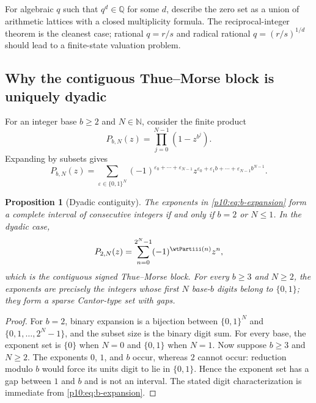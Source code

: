 \documentclass[11pt]{article}
\numberwithin{equation}{section}
\newtheorem{proposition}[theorem]{Proposition}
\theoremstyle{definition}
\theoremstyle{remark}
\newcommand{\Q}{\mathbb Q}
\newcommand{\N}{\mathbb N}
\begin{document}
\begin{problem}
For algebraic $q$ such that $q^d\in\Q$ for some $d$, describe the zero set as a union of
arithmetic lattices with a closed multiplicity formula.  The reciprocal-integer theorem is
the cleanest case; rational $q=r/s$ and radical rational $q=(r/s)^{1/d}$ should lead to a
finite-state valuation problem.
\end{problem}

\subsection{Why the contiguous Thue--Morse block is uniquely dyadic}

For an integer base $b\ge2$ and $N\in\N$, consider the finite product
\begin{equation}
 P_{b,N}(z)=\prod_{j=0}^{N-1}(1-z^{b^j}).                    \label{p10:eq:b-product}
\end{equation}
Expanding by subsets gives
\begin{equation}
 P_{b,N}(z)
 =\sum_{\varepsilon\in\{0,1\}^N}
  (-1)^{\varepsilon_0+\cdots+\varepsilon_{N-1}}
  z^{\varepsilon_0+\varepsilon_1b+\cdots+\varepsilon_{N-1}b^{N-1}}. \label{p10:eq:b-expansion}
\end{equation}

\begin{proposition}[Dyadic contiguity]
\label{p10:prop:dyadic-contiguity}
The exponents in \eqref{p10:eq:b-expansion} form a complete interval of consecutive integers if
and only if $b=2$ or $N\le1$.  In the dyadic case,
\begin{equation}
 P_{2,N}(z)=\sum_{n=0}^{2^N-1}(-1)^{\wtPartiii(n)}z^n,              \label{p10:eq:tm-block}
\end{equation}
which is the contiguous signed Thue--Morse block.  For every $b\ge3$ and $N\ge2$, the
exponents are precisely the integers whose first $N$ base-$b$ digits belong to $\{0,1\}$;
they form a sparse Cantor-type set with gaps.
\end{proposition}

\begin{proof}
For $b=2$, binary expansion is a bijection between $\{0,1\}^N$ and
$\{0,1,\ldots,2^N-1\}$, and the subset size is the binary digit sum.  For every base, the
exponent set is $\{0\}$ when $N=0$ and $\{0,1\}$ when $N=1$.  Now suppose $b\ge3$ and
$N\ge2$.  The exponents $0$, $1$, and $b$ occur, whereas $2$ cannot occur: reduction modulo
$b$ would force its units digit to lie in $\{0,1\}$.  Hence the exponent set has a gap
between $1$ and $b$ and is not an interval.  The stated digit characterization is immediate
from \eqref{p10:eq:b-expansion}.
\end{proof}
\end{document}
